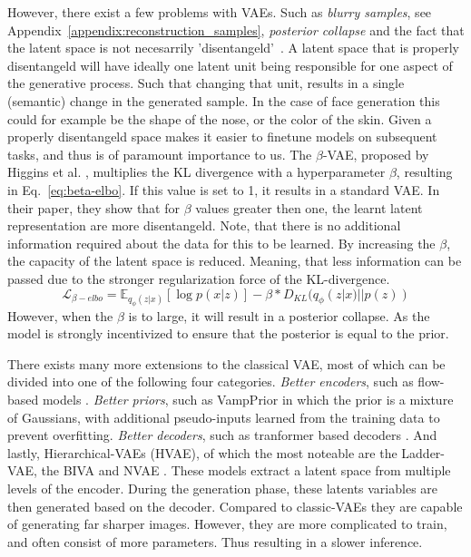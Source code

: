 However, there exist a few problems with VAEs\cite{tomczak2021deep}. Such as \emph{blurry samples}, see Appendix~\ref{appendix:reconstruction_samples}, \emph{posterior collapse}\cite{DBLP:journals/corr/BowmanVVDJB15} and the fact that the latent space is not necesarrily 'disentangeld'~\cite{higgins2017betavae}. A latent space that is properly disentangeld will have ideally one latent unit being responsible for one aspect of the generative process. Such that changing that unit, results in a single (semantic) change in the generated sample. In the case of face generation this could for example be the shape of the nose, or the color of the skin. Given a properly disentangeld space makes it easier to finetune models on subsequent tasks\cite{bengio2014representationlearningreviewnew}, and thus is of paramount importance to us. The $\beta$-VAE, proposed by Higgins et al. \cite{higgins2017betavae}, multiplies the KL divergence with a hyperparameter $\beta$, resulting in Eq.~\ref{eq:beta-elbo}. If this value is set to 1, it results in a standard VAE. In their paper, they show that for $\beta$ values greater then one, the learnt latent representation are more disentangeld. Note, that there is no additional information required about the data for this to be learned. By increasing the $\beta$, the capacity of the latent space is reduced. Meaning, that less information can be passed due to the stronger regularization force of the KL-divergence.
\begin{equation}
    \mathcal{L}_{\beta-elbo} = \mathbb{E}_{q_{\phi}(z|x)}[\log p(x|z)] - \beta * D_{KL}(q_{\phi}(z|x) || p(z))
    \label{eq:beta-elbo}
\end{equation}
However, when the $\beta$ is to large, it will result in a posterior collapse. As the model is strongly incentivized to ensure that the posterior is equal to the prior.

There exists many more extensions to the classical VAE, most of which can be divided into one of the following four categories. \emph{Better encoders}, such as flow-based models \cite{Berg2018SylvesterNF,tomczak2017improving,rezende2015variational}. \emph{Better priors}, such as VampPrior \cite{tomczak2018vae} in which the prior is a mixture of Gaussians, with additional pseudo-inputs learned from the training data to prevent overfitting. \emph{Better decoders}, such as tranformer based decoders \cite{Henderson2022AVA,9054554}. And lastly, Hierarchical-VAEs (HVAE), of which the most noteable are the Ladder-VAE\cite{NIPS2016_6ae07dcb}, the BIVA \cite{maaloe2019biva} and NVAE \cite{vahdat2020nvae}. These models extract a latent space from multiple levels of the encoder. During the generation phase, these latents variables are then generated based on the decoder. Compared to classic-VAEs they are capable of generating far sharper images. However, they are more complicated to train, and often consist of more parameters. Thus resulting in a slower inference.

